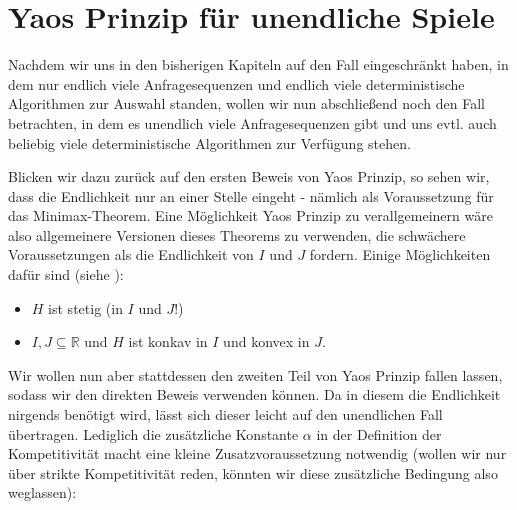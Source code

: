 \documentclass[a4paper,ngerman,12pt,bibtotoc]{scrartcl}
\theoremstyle{definition}
\theoremstyle{plain}
\theoremstyle{remark}
\newcommand{\RR}{\mathbb{R}}
\renewcommand{\_}{\mathpunct{.}\,}
\newcommand{\?}{\,{:}\,}
\newcommand{\Alg}{\ensuremath{\textsc{alg}}}
\newcommand{\Opt}{\ensuremath{\textsc{opt}}}
\newcommand{\EE}{\mathbf{E}}
\newcommand{\Hf}{H}
\begin{document}


	\section{Yaos Prinzip für unendliche Spiele}
	
	Nachdem wir uns in den bisherigen Kapiteln auf den Fall eingeschränkt haben, in dem nur endlich viele Anfragesequenzen und endlich viele deterministische Algorithmen zur Auswahl standen, wollen wir nun abschließend noch den Fall betrachten, in dem es unendlich viele Anfragesequenzen gibt und uns evtl. auch beliebig viele deterministische Algorithmen zur Verfügung stehen.
	
	Blicken wir dazu zurück auf den ersten Beweis von Yaos Prinzip, so sehen wir, dass die Endlichkeit nur an einer Stelle eingeht - nämlich als Voraussetzung für das Minimax-Theorem. Eine Möglichkeit Yaos Prinzip zu verallgemeinern wäre also allgemeinere Versionen dieses Theorems zu verwenden, die schwächere Voraussetzungen als die Endlichkeit von $I$ und $J$ fordern. Einige Möglichkeiten dafür sind (siehe \cite[Abschnitt 8.3]{OCCA}):
	\begin{itemize}
		\item $\Hf$ ist stetig (in $I$ und $J$!)
		\item $I, J \subseteq \RR$ und $\Hf$ ist konkav in $I$ und konvex in $J$.
	\end{itemize}
	
	Wir wollen nun aber stattdessen den zweiten Teil von Yaos Prinzip fallen lassen, sodass wir den direkten Beweis verwenden können. Da in diesem die Endlichkeit nirgends benötigt wird, lässt sich dieser leicht auf den unendlichen Fall übertragen. Lediglich die zusätzliche Konstante $\alpha$ in der Definition der Kompetitivität macht eine kleine Zusatzvoraussetzung notwendig (wollen wir nur über strikte Kompetitivität reden, könnten wir diese zusätzliche Bedingung also weglassen):
	
\end{document}

